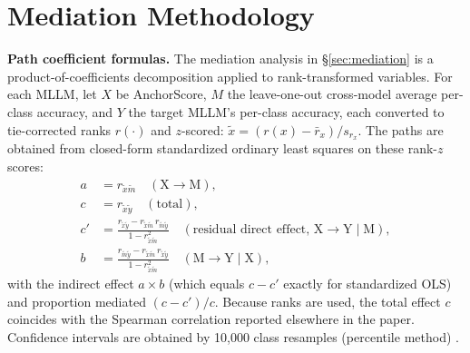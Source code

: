 \documentclass[a4paper,fleqn]{cas-sc}
\begin{document}
\appendix
\section{Mediation Methodology}
\label{sec:mediation_appendix}

\textbf{Path coefficient formulas.}
The mediation analysis in \S\ref{sec:mediation} is a product-of-coefficients decomposition \cite{baron1986moderator, mackinnon2002comparison} applied to rank-transformed variables. For each MLLM, let $X$ be AnchorScore, $M$ the leave-one-out cross-model average per-class accuracy, and $Y$ the target MLLM's per-class accuracy, each converted to tie-corrected ranks $r(\cdot)$ and $z$-scored: $\tilde{x} = (r(x)-\bar{r}_x)/s_{r_x}$. The paths are obtained from closed-form standardized ordinary least squares on these rank-$z$ scores:
\begin{align}
a &= r_{\tilde{x}\tilde{m}} \quad (\text{X}\rightarrow\text{M}), \\
c &= r_{\tilde{x}\tilde{y}} \quad (\text{total}), \\
c' &= \frac{r_{\tilde{x}\tilde{y}} - r_{\tilde{x}\tilde{m}}\,r_{\tilde{m}\tilde{y}}}{1 - r_{\tilde{x}\tilde{m}}^2} \quad (\text{residual direct effect, X}\rightarrow\text{Y}{\mid}\text{M}), \\
b &= \frac{r_{\tilde{m}\tilde{y}} - r_{\tilde{x}\tilde{m}}\,r_{\tilde{x}\tilde{y}}}{1 - r_{\tilde{x}\tilde{m}}^2} \quad (\text{M}\rightarrow\text{Y}{\mid}\text{X}),
\end{align}
with the indirect effect $a\times b$ (which equals $c-c'$ exactly for standardized OLS) and proportion mediated $(c-c')/c$. Because ranks are used, the total effect $c$ coincides with the Spearman correlation reported elsewhere in the paper. Confidence intervals are obtained by 10{,}000 class resamples (percentile method) \cite{preacher2008asymptotic}.
\end{document}
